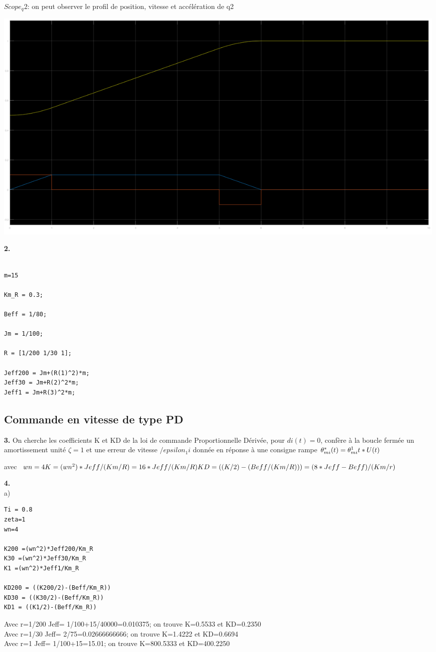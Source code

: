\documentclass[12pt]{article}
\begin{document}
\clearpage
$Scope_q2$: on peut observer le profil de position, vitesse et accélération de q2
\begin{flushleft}
\includegraphics[width=\textwidth,height=\textheight,keepaspectratio]{1_1_q2.PNG}
\end{flushleft}

\textbf{2.}
\begin{lstlisting}[style=Matlab-editor]

m=15

Km_R = 0.3;

Beff = 1/80;

Jm = 1/100;

R = [1/200 1/30 1];

Jeff200 = Jm+(R(1)^2)*m;
Jeff30 = Jm+R(2)^2*m;
Jeff1 = Jm+R(3)^2*m;

\end{lstlisting}

\subsection{Commande en vitesse de type PD}
\textbf{3.} On cherche les coefficients K et KD de la loi de commande Proportionnelle Dérivée, pour $di(t)=0$, confère à la boucle fermée un amortissement unité $\zeta=1$ et une erreur de vitesse $/epsilon_1i$ donnée en réponse à une consigne rampe 
$\theta_{mi}^{*}(t)=\theta_{mi}^{1}t*U(t)\\$

avec $
wn=4 \\
K =(wn^2)*Jeff/(Km/R)=16*Jeff/(Km/R)\\
KD =((K/2)-(Beff/(Km/R)))=(8*Jeff-Beff)/(Km/r)
$

\textbf{4.}\\
a)
\begin{lstlisting}[style=Matlab-editor]
Ti = 0.8
zeta=1
wn=4

K200 =(wn^2)*Jeff200/Km_R
K30 =(wn^2)*Jeff30/Km_R
K1 =(wn^2)*Jeff1/Km_R

KD200 = ((K200/2)-(Beff/Km_R))
KD30 = ((K30/2)-(Beff/Km_R))
KD1 = ((K1/2)-(Beff/Km_R))
\end{lstlisting}
Avec r=1/200 Jeff= 1/100+15/40000=0.010375; on trouve K=0.5533 et KD=0.2350\\
Avec r=1/30  Jeff= 2/75=0.02666666666; on trouve K=1.4222 et KD=0.6694\\
Avec r=1     Jeff= 1/100+15=15.01; on trouve K=800.5333 et KD=400.2250\\
\end{document}
